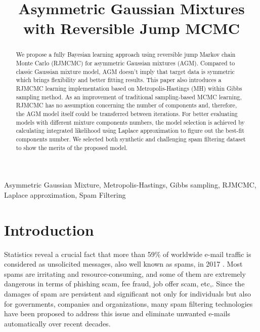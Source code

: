 \documentclass[conference]{IEEEtran}
\begin{document}
\title{Asymmetric Gaussian Mixtures with Reversible Jump MCMC\\
}

\author{
\and
{}
}

\maketitle

\begin{abstract}
We propose a fully Bayesian learning approach using reversible jump Markov  chain Monte Carlo (RJMCMC) for asymmetric Gaussian mixtures (AGM). Compared to classic Gaussian mixture model, AGM doesn't imply that target data is symmetric which brings flexibility and better fitting results. This paper also introduces a RJMCMC learning implementation based on Metropolis-Hastings (MH) within Gibbs sampling method. As an improvement of traditional sampling-based MCMC learning, RJMCMC has no assumption concerning the number of components and, therefore, the AGM model itself could be transferred between iterations. For better evaluating models with different mixture components numbers, the model selection is achieved by calculating integrated likelihood using Laplace approximation to figure out the best-fit components number. We selected both synthetic and challenging spam filtering dataset to show the merits of the proposed model. 
\end{abstract}

\begin{IEEEkeywords}
Asymmetric Gaussian Mixture, Metropolis-Hastings, Gibbs sampling, RJMCMC, Laplace approximation, Spam Filtering
\end{IEEEkeywords}

\section{Introduction}
Statistics reveal a crucial fact that more than 59\% of worldwide e-mail traffic is considered as unsolicited messages, also well known as spams, in 2017 \cite{Lab2018}. Most spams are irritating and resource-consuming, and some of them are extremely dangerous in terms of phishing scam, fee fraud, job offer scam, etc,. Since the damages of spam are persistent and significant not only for individuals but also for governments, companies and organizations, many spam filtering technologies have been proposed to address this issue and eliminate unwanted e-mails automatically over recent decades. 
\end{document}
